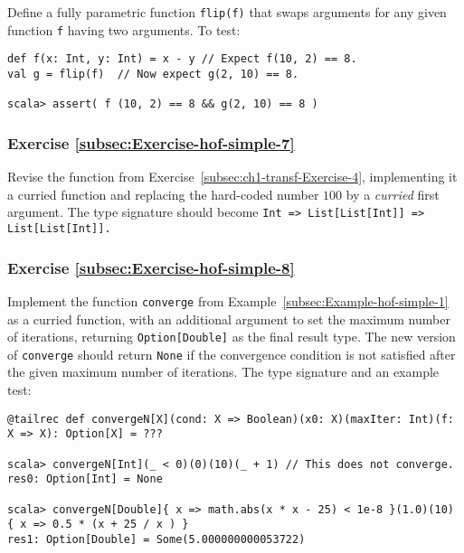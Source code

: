 Define a fully parametric function \lstinline!flip(f)! that swaps
arguments for any given function \lstinline!f! having two arguments.
To test: 

\begin{lstlisting}
def f(x: Int, y: Int) = x - y // Expect f(10, 2) == 8.
val g = flip(f)  // Now expect g(2, 10) == 8.

scala> assert( f (10, 2) == 8 && g(2, 10) == 8 )
\end{lstlisting}


\subsubsection{Exercise \label{subsec:Exercise-hof-simple-7}\ref{subsec:Exercise-hof-simple-7}}

Revise the function from Exercise~\ref{subsec:ch1-transf-Exercise-4},
implementing it a curried function and replacing the hard-coded number
$100$ by a \emph{curried} first argument. The type signature should
become \texttt{}\lstinline!Int => List[List[Int]] => List[List[Int]]!\texttt{.}

\subsubsection{Exercise \label{subsec:Exercise-hof-simple-8}\ref{subsec:Exercise-hof-simple-8}}

Implement the function \lstinline!converge! from Example~\ref{subsec:Example-hof-simple-1}
as a curried function, with an additional argument to set the maximum
number of iterations, returning \lstinline!Option[Double]! as the
final result type. The new version of \lstinline!converge! should
return \lstinline!None! if the convergence condition is not satisfied
after the given maximum number of iterations. The type signature and
an example test:
\begin{lstlisting}
@tailrec def convergeN[X](cond: X => Boolean)(x0: X)(maxIter: Int)(f: X => X): Option[X] = ???

scala> convergeN[Int](_ < 0)(0)(10)(_ + 1) // This does not converge.
res0: Option[Int] = None

scala> convergeN[Double]{ x => math.abs(x * x - 25) < 1e-8 }(1.0)(10) { x => 0.5 * (x + 25 / x ) }
res1: Option[Double] = Some(5.000000000053722)
\end{lstlisting}
\begin{comment}
Solution:
\begin{lstlisting}
@tailrec def convergeN[X](p: X => Boolean)(x:X)(m:Int)(f: X => X): Option[X] =  {
              if (m <= 0) None
              else if (p(x)) Some(x) else converge(p)(f(x))(m-1)(f)             } // Defining as def convergeN[X]: (X => Boolean) => X => Int => (X => X) => Option[X] = ??? will break tail recursion!
\end{lstlisting}
\end{comment}


